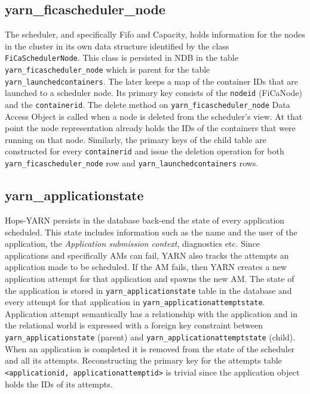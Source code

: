 \subsection{yarn\_ficascheduler\_node}
\label{ssec:impl_fk_fica_node}
The scheduler, and specifically Fifo and Capacity, holds information for the nodes in the cluster in its
own data structure identified by the class \texttt{FiCaSchedulerNode}. This
class is persisted in NDB in the table
\texttt{yarn\_ficascheduler\_node} which is parent for the table
\texttt{yarn\_launchedcontainers}. The later keeps a map of the
container IDs that are launched to a scheduler node. Its primary key
consists of the \texttt{nodeid} (FiCaNode) and the
\texttt{containerid}. The delete method on
\texttt{yarn\_ficascheduler\_node} Data Access Object is called when a
node is deleted from the scheduler's view. At that point the node
representation already holds the IDs of the containers that were
running on that node. Similarly, the primary keys of the child table are constructed
for every \texttt{containerid} and issue the deletion operation for both
\texttt{yarn\_ficascheduler\_node} row and
\texttt{yarn\_launchedcontainers} rows.

\subsection{yarn\_applicationstate}
\label{ssec:impl_fk_appstate}
Hops-YARN persists in the database back-end the state of every
application scheduled. This state includes information such as the
name and the user of the application, the \emph{Application submission
  context}, diagnostics etc. Since applications and specifically AMs
can fail, YARN also tracks the attempts an application made to be scheduled.
If the AM fails, then YARN creates a new application attempt
for that application and spawns the new AM. The state of the
application is stored in \texttt{yarn\_applicationstate} table in the
database and every attempt for that application in
\texttt{yarn\_applicationattemptstate}. Application attempt
semantically has a relationship with the application and in the
relational world is expressed with a foreign key constraint
between \texttt{yarn\_applicationstate} (parent) and
\texttt{yarn\_applicationattemptstate} (child). When an application
is completed it is removed from the state of the scheduler and all
its attempts. Reconstructing the primary key for the attempts table
\texttt{<applicationid, applicationattemptid>} is trivial since the
application object holds the IDs of its attempts.

